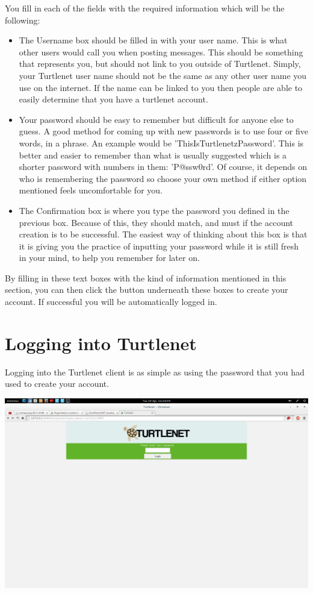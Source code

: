 You fill in each of the fields with the required information which will be the
following:
\begin{itemize}
\item The Username box should be filled in with your user name. This is what
      other users would call you when posting messages. This should be 
      something that represents you, but should not link to you outside of
      Turtlenet. Simply, your Turtlenet user name should not be the same as
      any other user name you use on the internet. If the name can be linked to
      you then people are able to easily determine that you have a turtlenet
      account.
\item Your password should be easy to remember but difficult for
      anyone else to guess. A good method for coming up with new passwords is
      to use four or five words, in a phrase. An example would be
      'ThisIsTurtlenetzPassword'. This is better and easier to remember than
      what is usually suggested which is a shorter password with numbers in
      them: 'P@ssw0rd'. Of course, it depends on who is remembering the
      password so choose your own method if either option mentioned feels
      uncomfortable for you.
\item The Confirmation box is where you type the password you defined in the
      previous box. Because of this, they should match, and must if the account
      creation is to be successful. The easiest way of thinking about this box
      is that it is giving you the practice of inputting your password while it
      is still fresh in your mind, to help you remember for later on.
\end{itemize}

By filling in these text boxes with the kind of information mentioned in this
section, you can then click the button underneath these boxes to create your
account. If successful you will be automatically logged in.

\pagebreak
\section{Logging into Turtlenet}
Logging into the Turtlenet client is as simple as using the password that you
had used to create your account.

\includegraphics[scale=0.2]{screenshots/Screenshot from 2014-04-29 22-24-59}

